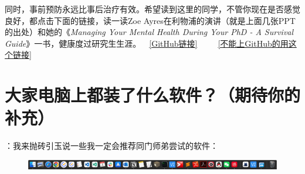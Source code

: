同时，事前预防永远比事后治疗有效。希望读到这里的同学，不管你现在是否感觉良好，都点击下面的链接，读一读Zoe Ayres在利物浦的演讲（就是上面几张PPT的出处）和她的《\textit{Managing Your Mental Health During Your PhD - A Survival Guide}》一书，健康度过研究生生涯。~~\href{https://github.com/kaiwu-astro/xp_pgrs_unofficial_guide/tree/main/fileshare}{[GitHub链接]}~~~~~\href{https://gitee.com/kaiwu-astro/xp_pgrs_unofficial_guide/tree/main/fileshare}{[不能上GitHub的用这个链接]}

\section{大家电脑上都装了什么软件？（期待你的补充）}

\KW：我来抛砖引玉说一些我一定会推荐同门师弟尝试的软件：
\begin{figure}[H]
    \includegraphics[width=\columnwidth]{author-folder/Kai.Wu/kai_mac_dock.jpg}
\end{figure}
